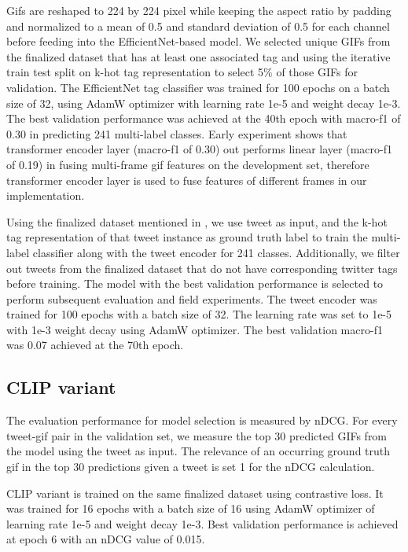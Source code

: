 Gifs are reshaped to 224 by 224 pixel while keeping the aspect ratio by padding and normalized to a mean of 0.5 and standard deviation of 0.5 for each channel before feeding into the EfficientNet-based model.
We selected unique GIFs from the finalized dataset that has at least one associated tag and using the iterative train test split on k-hot tag representation to select 5\% of those GIFs for validation.
The EfficientNet tag classifier was trained for 100 epochs on a batch size of 32, using AdamW optimizer with learning rate 1e-5 and weight decay 1e-3. The best validation performance was achieved at the 40th epoch with macro-f1 of 0.30 in predicting 241 multi-label classes.
Early experiment shows that transformer encoder layer (macro-f1 of 0.30) out performs linear layer (macro-f1 of 0.19) in fusing multi-frame gif features on the development set, therefore transformer encoder layer is used to fuse features of different frames in our implementation.

Using the finalized dataset mentioned in , we use tweet as input, and the k-hot tag representation of that tweet instance as ground truth label to train the multi-label classifier along with the tweet encoder for 241 classes. Additionally, we filter out tweets from the finalized dataset that do not have corresponding twitter tags before training. The model with the best validation performance is selected to perform subsequent evaluation and field experiments.
The tweet encoder was trained for 100 epochs with a batch size of 32. The learning rate was set to 1e-5 with 1e-3 weight decay using AdamW optimizer. The best validation macro-f1 was 0.07 achieved at the 70th epoch.

\subsection{CLIP variant}
The evaluation performance for model selection is measured by nDCG. For every tweet-gif pair in the validation set, we measure the top 30 predicted GIFs from the model using the tweet as input. The relevance of an occurring ground truth gif in the top 30 predictions given a tweet is set 1 for the nDCG calculation.

CLIP variant is trained on the same finalized dataset using contrastive loss. It was trained for 16 epochs with a batch size of 16 using AdamW optimizer of learning rate 1e-5 and weight decay 1e-3. Best validation performance is achieved at epoch 6 with an nDCG value of 0.015.

